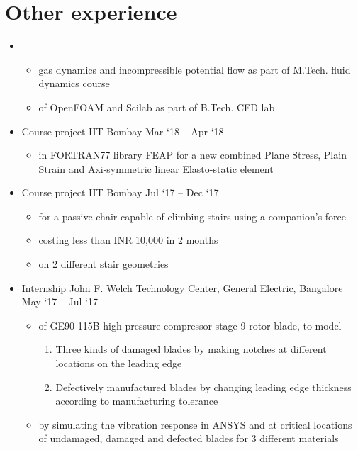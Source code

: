 \documentclass[a4paper,10pt]{article}
\newcommand{\of}{OpenFOAM}
\newcommand{\feap}{FEAP}
\begin{document}
\section{Other experience}
\begin{itemize}
	\item {}
	\begin{itemize}
		\item {} gas dynamics and incompressible potential flow as part of M.Tech. fluid dynamics course
		\item {} of \of{} and Scilab as part of B.Tech. CFD lab
	\end{itemize}
	\item {}
	{Course project}
	{IIT Bombay}
	{Mar `18 -- Apr `18}
	\begin{itemize}
		\item {} in FORTRAN77 library \feap{} for a new combined Plane Stress, Plain Strain and Axi-symmetric linear Elasto-static element
	\end{itemize}
	\item {}
	{Course project}
	{IIT Bombay}
	{Jul `17 -- Dec `17}
	\begin{itemize}
		\item {} for a passive chair capable of climbing stairs using a companion's force
		\item {} costing less than INR 10,000 in 2 months
		\item {} on 2 different stair geometries
	\end{itemize}
	\item {}
	{Internship}
	{John F. Welch Technology Center, General Electric, Bangalore}
	{May `17 -- Jul `17}
	\begin{itemize}
		\item {} of GE90-115B high pressure compressor stage-9 rotor blade, to model
		\begin{enumerate}
			\item Three kinds of damaged blades by making notches at different locations on the leading edge
			\item Defectively manufactured blades by changing leading edge thickness according to manufacturing tolerance
		\end{enumerate}
		\item {} by simulating the vibration response in ANSYS and  at critical locations of undamaged, damaged and defected blades for 3 different materials
	\end{itemize}
\end{itemize}
\end{document}
